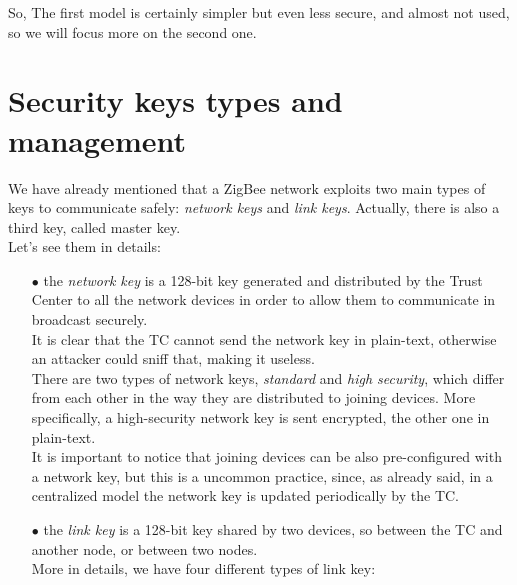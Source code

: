 \documentclass[12pt]{report}
\begin{document}
{{So, The first model is certainly simpler but even less secure, and almost not used, so we will focus more on the second one}.\\

\section{Security keys types and management}
\bigskip
We have already mentioned that a ZigBee network exploits two main types of keys to communicate safely: \emph{network keys} and \emph{link keys}. Actually, there is also a third key, called master key.\\
Let's see them in details:

\begin{itemize}
\setlength{\itemindent}{+4mm}
\item[$\bullet$] the \emph{network key} is a 128-bit key generated and distributed by the Trust Center to all the network devices in order to allow them to communicate in broadcast securely.\\
It is clear that the TC cannot send the network key in plain-text, otherwise an attacker could sniff that, making it useless.\\
There are two types of network keys, \emph{standard} and \emph{high security}, which differ from each other in the way they are distributed to joining devices. More specifically, a high-security network key is sent encrypted, the other one in plain-text.\\
It is important to notice that joining devices can be also pre-configured with a network key, but this is a uncommon practice, since, as already said,  in a centralized model the network key is updated periodically by the TC.
\item[$\bullet$] the \emph{link key} is a 128-bit key shared by two devices, so between the TC and another node, or between two nodes.\\
More in details, we have four different types of link key:


\end{itemize}}
\end{document}
